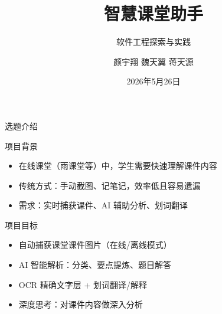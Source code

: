 \documentclass[aspectratio=169]{beamer}
\title{智慧课堂助手}
\subtitle{软件工程探索与实践}
\author{颜宇翔 \quad 魏天翼 \quad 蒋天源}
\institute{小组项目汇报}
\date{2026年5月26日}
\begin{document}
\begin{frame}
  \titlepage
\end{frame}

\begin{frame}{选题介绍}
  \begin{block}{项目背景}
    \begin{itemize}
      \item 在线课堂（雨课堂等）中，学生需要快速理解课件内容
      \item 传统方式：手动截图、记笔记，效率低且容易遗漏
      \item 需求：实时捕获课件、AI 辅助分析、划词翻译
    \end{itemize}
  \end{block}

  \begin{block}{项目目标}
    \begin{itemize}
      \item 自动捕获课堂课件图片（在线/离线模式）
      \item AI 智能解析：分类、要点提炼、题目解答
      \item OCR 精确文字层 + 划词翻译/解释
      \item 深度思考：对课件内容做深入分析
    \end{itemize}
  \end{block}
\end{frame}
\end{document}
